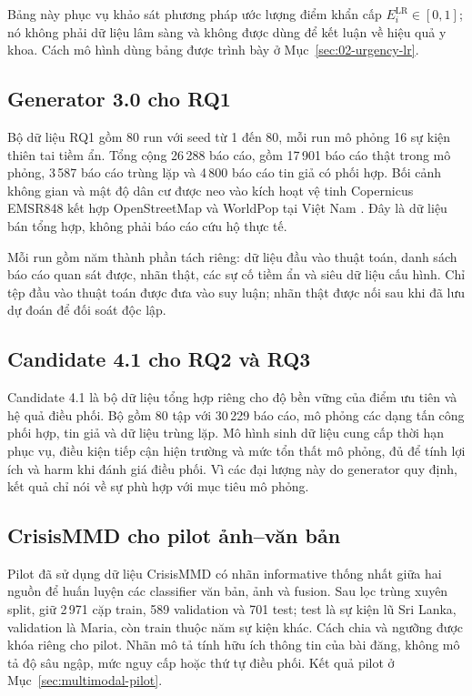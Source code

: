 Bảng này phục vụ khảo sát phương pháp ước lượng điểm khẩn cấp $E_i^{\mathrm{LR}}\in[0,1]$; nó không phải dữ liệu lâm sàng và không được dùng để kết luận về hiệu quả y khoa. Cách mô hình dùng bảng được trình bày ở Mục~\ref{sec:02-urgency-lr}.

\subsection{Generator 3.0 cho RQ1}
Bộ dữ liệu RQ1 gồm 80 run với seed từ 1 đến 80, mỗi run mô phỏng 16 sự kiện thiên tai tiềm ẩn. Tổng cộng 26\,288 báo cáo, gồm 17\,901 báo cáo thật trong mô phỏng, 3\,587 báo cáo trùng lặp và 4\,800 báo cáo tin giả có phối hợp. Bối cảnh không gian và mật độ dân cư được neo vào kích hoạt vệ tinh Copernicus EMSR848 kết hợp OpenStreetMap và WorldPop tại Việt Nam \citep{copernicusEMSR848,worldpop2025vietnam}. Đây là dữ liệu bán tổng hợp, không phải báo cáo cứu hộ thực tế.

Mỗi run gồm năm thành phần tách riêng: dữ liệu đầu vào thuật toán, danh sách báo cáo quan sát được, nhãn thật, các sự cố tiềm ẩn và siêu dữ liệu cấu hình. Chỉ tệp đầu vào thuật toán được đưa vào suy luận; nhãn thật được nối sau khi đã lưu dự đoán để đối soát độc lập.

\subsection{Candidate 4.1 cho RQ2 và RQ3}
Candidate 4.1 là bộ dữ liệu tổng hợp riêng cho độ bền vững của điểm ưu tiên và hệ quả điều phối. Bộ gồm 80 tập với 30\,229 báo cáo, mô phỏng các dạng tấn công phối hợp, tin giả và dữ liệu trùng lặp. Mô hình sinh dữ liệu cung cấp thời hạn phục vụ, điều kiện tiếp cận hiện trường và mức tổn thất mô phỏng, đủ để tính lợi ích và harm khi đánh giá điều phối. Vì các đại lượng này do generator quy định, kết quả chỉ nói về sự phù hợp với mục tiêu mô phỏng.

\subsection{CrisisMMD cho pilot ảnh--văn bản}
Pilot đã sử dụng dữ liệu CrisisMMD \citep{alam2018crisismmd} có nhãn informative thống nhất giữa hai nguồn để huấn luyện các classifier văn bản, ảnh và fusion. Sau lọc trùng xuyên split, giữ 2\,971 cặp train, 589 validation và 701 test; test là sự kiện lũ Sri Lanka, validation là Maria, còn train thuộc năm sự kiện khác. Cách chia và ngưỡng được khóa riêng cho pilot. Nhãn mô tả tính hữu ích thông tin của bài đăng, không mô tả độ sâu ngập, mức nguy cấp hoặc thứ tự điều phối. Kết quả pilot ở Mục~\ref{sec:multimodal-pilot}.

